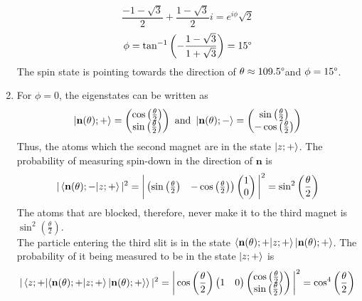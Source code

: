 \begin{sol}
\begin{enumerate}[label=\textbf{(\alph*)}]
\begin{equation}
\end{equation}
    \begin{equation}
	\frac{-1-\sqrt{3}}{2}+\frac{1-\sqrt{3}}{2}i=e^{i\phi}\sqrt{2}
\end{equation} 
    \begin{equation}
	\phi=\tan^{-1}\left(-\frac{1-\sqrt{3}}{1+\sqrt{3}}\right)=15\degree
\end{equation} 
    The spin state is pointing towards the direction of $\theta\approx 109.5\degree$and $\phi=15\degree$.
    \item
    For $\phi=0$, the eigenstates can be written as
    \begin{equation}
	\ket{\mathbf{n}(\theta);+}=\begin{pmatrix}\cos\left(\frac{\theta}{2}\right)\\\sin\left(\frac{\theta}{2}\right)\end{pmatrix} \text{ and }\ket{\mathbf{n}(\theta);-}=\begin{pmatrix}\sin\left(\frac{\theta}{2}\right)\\-\cos\left(\frac{\theta}{2}\right)\end{pmatrix}
\end{equation}  
    Thus, the atoms which the second magnet are in the state $\ket{z;+}$. The probability of measuring spin-down in the direction of $\mathbf{n}$ is 
    \begin{equation}
	|\braket{\mathbf{n}(\theta);-}{z;+}|^2=\bigg|\begin{pmatrix}\sin\left(\frac{\theta}{2}\right)&-\cos\left(\frac{\theta}{2}\right)\end{pmatrix}\begin{pmatrix}1\\0\end{pmatrix}\bigg|^2=\sin^2\left(\frac{\theta}{2}\right)
\end{equation}
    The atoms that are blocked, therefore, never make it to the third magnet is $\sin^2(\frac{\theta}{2})$.\\
    The particle entering the third slit is in the state $\braket{\mathbf{n}(\theta);+}{z;+}\ket{\mathbf{n}(\theta);+}$. The probability of it being measured to be in the state $\ket{z;+}$ is
    \begin{equation}
	|\braket{z;+}{\braket{\mathbf{n}(\theta);+}{z;+}\ket{\mathbf{n}(\theta);+}}|^2=\bigg|\cos\left(\frac{\theta}{2}\right)\begin{pmatrix}1&0\end{pmatrix}\begin{pmatrix}\cos\left(\frac{\theta}{2}\right)\\\sin\left(\frac{\theta}{2}\right)\end{pmatrix}\bigg|^2=\cos^4\left(\frac{\theta}{2}\right)

\end{equation}
\end{enumerate}
\end{sol}
